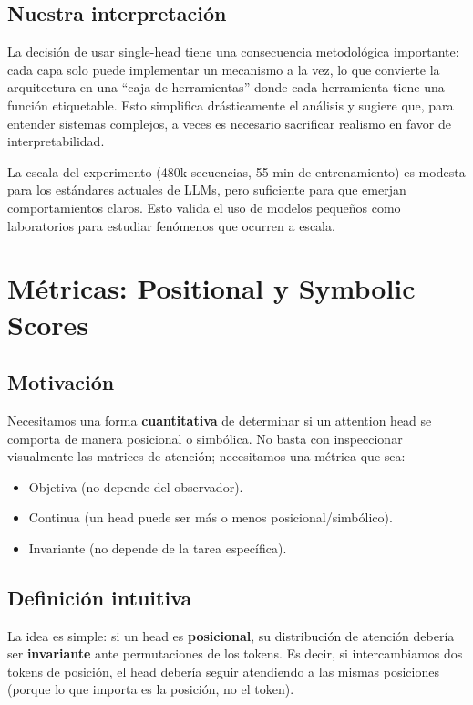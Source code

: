 \documentclass[12pt,a4paper,oneside]{report}
\begin{document}
\section{Nuestra interpretación}

La decisión de usar single-head tiene una consecuencia metodológica importante: cada capa solo puede implementar un mecanismo a la vez, lo que convierte la arquitectura en una ``caja de herramientas'' donde cada herramienta tiene una función etiquetable. Esto simplifica drásticamente el análisis y sugiere que, para entender sistemas complejos, a veces es necesario sacrificar realismo en favor de interpretabilidad.

La escala del experimento (480k secuencias, 55 min de entrenamiento) es modesta para los estándares actuales de LLMs, pero suficiente para que emerjan comportamientos claros. Esto valida el uso de modelos pequeños como laboratorios para estudiar fenómenos que ocurren a escala.

\chapter{Métricas: Positional y Symbolic Scores}

\section{Motivación}

Necesitamos una forma \textbf{cuantitativa} de determinar si un attention head se comporta de manera posicional o simbólica. No basta con inspeccionar visualmente las matrices de atención; necesitamos una métrica que sea:
\begin{itemize}
    \item Objetiva (no depende del observador).
    \item Continua (un head puede ser más o menos posicional/simbólico).
    \item Invariante (no depende de la tarea específica).
\end{itemize}

\section{Definición intuitiva}

La idea es simple: si un head es \textbf{posicional}, su distribución de atención debería ser \textbf{invariante} ante permutaciones de los tokens. Es decir, si intercambiamos dos tokens de posición, el head debería seguir atendiendo a las mismas posiciones (porque lo que importa es la posición, no el token).
\end{document}
